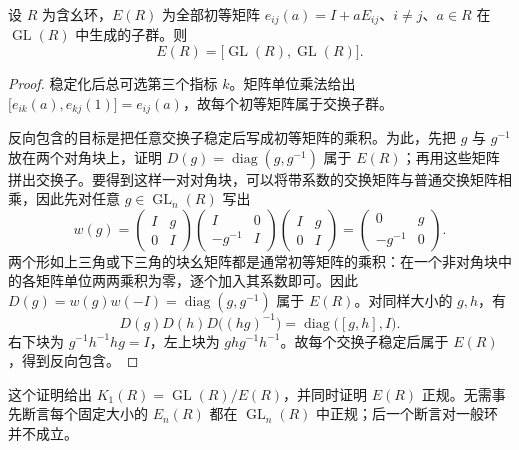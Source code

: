 \begin{lemma}[稳定初等矩阵与交换子]\label{b4:lem:B-whitehead}
	设 \(R\) 为含幺环，\(E(R)\) 为全部初等矩阵 \(e_{ij}(a)=I+aE_{ij}\)、\(i\ne j\)、\(a\in R\) 在 \(\operatorname{GL}(R)\) 中生成的子群。则
	\[
		E(R)=\bigl[\operatorname{GL}(R),\operatorname{GL}(R)\bigr].
	\]
\end{lemma}
\begin{proof}
	稳定化后总可选第三个指标 \(k\)。矩阵单位乘法给出 \(\bigl[e_{ik}(a),e_{kj}(1)\bigr]=e_{ij}(a)\)，故每个初等矩阵属于交换子群。

	反向包含的目标是把任意交换子稳定后写成初等矩阵的乘积。为此，先把 \(g\) 与 \(g^{-1}\) 放在两个对角块上，证明 \(D(g)=\operatorname{diag}(g,g^{-1})\) 属于 \(E(R)\)；再用这些矩阵拼出交换子。要得到这样一对对角块，可以将带系数的交换矩阵与普通交换矩阵相乘，因此先对任意 \(g\in\operatorname{GL}_n(R)\) 写出
	\[
		w(g)=
		\begin{pmatrix}I&g\\0&I\end{pmatrix}
		\begin{pmatrix}I&0\\-g^{-1}&I\end{pmatrix}
		\begin{pmatrix}I&g\\0&I\end{pmatrix}
		=
		\begin{pmatrix}0&g\\-g^{-1}&0\end{pmatrix}.
	\]
	两个形如上三角或下三角的块幺矩阵都是通常初等矩阵的乘积：在一个非对角块中的各矩阵单位两两乘积为零，逐个加入其系数即可。因此 \(D(g)=w(g)w(-I)=\operatorname{diag}(g,g^{-1})\) 属于 \(E(R)\)。对同样大小的 \(g,h\)，有
	\[
		D(g)D(h)D\bigl((hg)^{-1}\bigr) =\operatorname{diag}\bigl([g,h],I\bigr).
	\]
	右下块为 \(g^{-1}h^{-1}hg=I\)，左上块为 \(ghg^{-1}h^{-1}\)。故每个交换子稳定后属于 \(E(R)\)，得到反向包含。
\end{proof}

这个证明给出 \(K_1(R)=\operatorname{GL}(R)/E(R)\)，并同时证明 \(E(R)\) 正规。无需事先断言每个固定大小的 \(E_n(R)\) 都在 \(\operatorname{GL}_n(R)\) 中正规；后一个断言对一般环并不成立。

